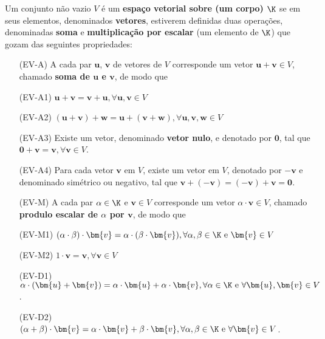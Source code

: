 Um conjunto não vazio $V$ é um \textbf{espaço vetorial sobre (um corpo) $\K$}
se em seus elementos, denominados \textbf{vetores}, estiverem definidas
duas operações, denominadas \textbf{soma} e \textbf{multiplicação por escalar}
(um elemento de $\K$) que gozam das seguintes propriedades:

\begin{itemize}
\item [(EV-A)] A cada par $\bm{u}$, $\bm{v}$ de vetores de $V$ corresponde um vetor
$\bm{u} + \bm{v} \in V$, chamado \textbf{soma de $\bm{u}$ e $\bm{v}$}, de modo que
\item [(EV-A1)] $\bm{u} + \bm{v} = \bm{v} + \bm{u}, \forall \bm{u},\bm{v} \in V$
\item [(EV-A2)] $(\bm{u} + \bm{v}) + \bm{w} = \bm{u} + (\bm{v} + \bm{w}), \forall \bm{u},\bm{v},\bm{w} \in V$
\item [(EV-A3)] Existe um vetor, denominado \textbf{vetor nulo}, e denotado por
$\bm{0}$, tal que $\bm{0} + \bm{v} = \bm{v}, \forall \bm{v} \in V$.
\item [(EV-A4)] Para cada vetor $\bm{v}$ em $ V$, existe um vetor em $V$,
denotado por $-\bm{v}$ e denominado simétrico ou negativo, tal que
$\bm{v} + (-\bm{v}) = (-\bm{v}) + \bm{v} = \bm{0}$.
\end{itemize}

\begin{itemize}
\item [(EV-M)] A cada par $\alpha \in \K$ e $\bm{v} \in V$ corresponde um
vetor $\alpha \cdot \bm{v} \in V$, chamado \textbf{produlo escalar de $\alpha$ por $\bm{v}$}, de modo que
\item [(EV-M1)] $(\alpha \cdot \beta)\cdot \bm{v} = \alpha \cdot (\beta \cdot \bm{v}), \forall \alpha, \beta \in \K \text{ e } \bm{v} \in V$
\item [(EV-M2)] $1 \cdot \bm{v} = \bm{v}, \forall \bm{v} \in V$
\end{itemize}

\begin{itemize}
\item [(EV-D1)] $\alpha \cdot (\bm{u} + \bm{v}) = \alpha \cdot \bm{u} + \alpha \cdot \bm{v}, \forall \alpha \in \K \text{ e } \forall \bm{u},\bm{v} \in V$.
\item [(EV-D2)] $(\alpha + \beta) \cdot \bm{v} = \alpha \cdot \bm{v} + \beta \cdot \bm{v}, \forall \alpha, \beta \in \K \text{ e } \forall \bm{v} \in V$.

\end{itemize}

